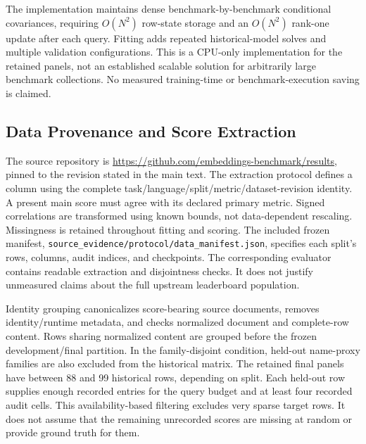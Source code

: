 \documentclass{article}
\begin{document}
The implementation maintains dense benchmark-by-benchmark conditional covariances, requiring $O(N^2)$ row-state storage and an $O(N^2)$ rank-one update after each query. Fitting adds repeated historical-model solves and multiple validation configurations. This is a CPU-only implementation for the retained panels, not an established scalable solution for arbitrarily large benchmark collections. No measured training-time or benchmark-execution saving is claimed.

\subsection{Data Provenance and Score Extraction}
The source repository is \url{https://github.com/embeddings-benchmark/results}, pinned to the revision stated in the main text. The extraction protocol defines a column using the complete task/language/split/metric/dataset-revision identity. A present main score must agree with its declared primary metric. Signed correlations are transformed using known bounds, not data-dependent rescaling. Missingness is retained throughout fitting and scoring. The included frozen manifest, \texttt{source\_evidence/protocol/data\_manifest.json}, specifies each split's rows, columns, audit indices, and checkpoints. The corresponding evaluator contains readable extraction and disjointness checks. It does not justify unmeasured claims about the full upstream leaderboard population.

Identity grouping canonicalizes score-bearing source documents, removes identity/runtime metadata, and checks normalized document and complete-row content. Rows sharing normalized content are grouped before the frozen development/final partition. In the family-disjoint condition, held-out name-proxy families are also excluded from the historical matrix. The retained final panels have between 88 and 99 historical rows, depending on split. Each held-out row supplies enough recorded entries for the query budget and at least four recorded audit cells. This availability-based filtering excludes very sparse target rows. It does not assume that the remaining unrecorded scores are missing at random or provide ground truth for them.
\end{document}
